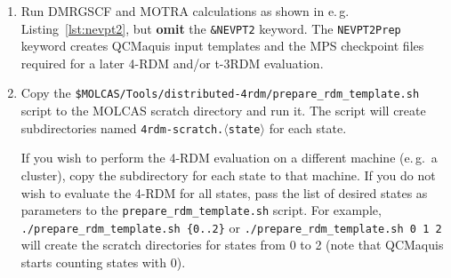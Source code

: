 \documentclass[bibliography=totoc,12pt,a4paper]{scrartcl}
\newcommand{\kwd}[1]{\texttt{#1}}
\newcommand{\myemph}[1]{\textbf{#1}}
\begin{document}
\begin{enumerate}
 \item Run DMRGSCF and MOTRA calculations as shown in e.\,g. Listing~\ref{lst:nevpt2}, but \myemph{omit} the \kwd{\&NEVPT2} keyword. The \kwd{NEVPT2Prep} keyword creates QCMaquis input templates and the MPS checkpoint files required for a later 4-RDM and/or t-3RDM evaluation.
 \item Copy the \kwd{\$MOLCAS/Tools/distributed-4rdm/prepare\_rdm\_template.sh} script to the MOLCAS scratch directory and run it. The script will create subdirectories named \kwd{4rdm-scratch.$\langle$state$\rangle$} for each state.

 If you wish to perform the 4-RDM evaluation on a different machine (e.\,g.\ a cluster), copy the subdirectory for each state to that machine.
 If you do not wish to evaluate the 4-RDM for all states, pass the list of desired states as parameters to the \kwd{prepare\_rdm\_template.sh} script. For example,
 \kwd{./prepare\_rdm\_template.sh \{0..2\}} or \kwd{./prepare\_rdm\_template.sh 0 1 2} will create the scratch directories for states from 0 to 2 (note that QCMaquis starts counting states with 0).


\end{enumerate}
\end{document}
